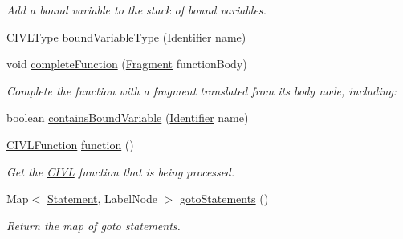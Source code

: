 \begin{DoxyCompactItemize}
\begin{DoxyCompactList}\small\item\em Add a bound variable to the stack of bound variables. \end{DoxyCompactList}\item 
\hyperlink{interfaceedu_1_1udel_1_1cis_1_1vsl_1_1civl_1_1model_1_1IF_1_1type_1_1CIVLType}{C\+I\+V\+L\+Type} \hyperlink{classedu_1_1udel_1_1cis_1_1vsl_1_1civl_1_1model_1_1common_1_1FunctionInfo_a1680ec437178dac2c5425ff419301e49}{bound\+Variable\+Type} (\hyperlink{interfaceedu_1_1udel_1_1cis_1_1vsl_1_1civl_1_1model_1_1IF_1_1Identifier}{Identifier} name)
\item 
void \hyperlink{classedu_1_1udel_1_1cis_1_1vsl_1_1civl_1_1model_1_1common_1_1FunctionInfo_a5fc1d2d85d5dac62ed6be12d10f61130}{complete\+Function} (\hyperlink{interfaceedu_1_1udel_1_1cis_1_1vsl_1_1civl_1_1model_1_1IF_1_1Fragment}{Fragment} function\+Body)
\begin{DoxyCompactList}\small\item\em Complete the function with a fragment translated from its body node, including\+: \end{DoxyCompactList}\item 
boolean \hyperlink{classedu_1_1udel_1_1cis_1_1vsl_1_1civl_1_1model_1_1common_1_1FunctionInfo_aa26f85c1a6c97f257de4e6d033dd98bb}{contains\+Bound\+Variable} (\hyperlink{interfaceedu_1_1udel_1_1cis_1_1vsl_1_1civl_1_1model_1_1IF_1_1Identifier}{Identifier} name)
\item 
\hyperlink{interfaceedu_1_1udel_1_1cis_1_1vsl_1_1civl_1_1model_1_1IF_1_1CIVLFunction}{C\+I\+V\+L\+Function} \hyperlink{classedu_1_1udel_1_1cis_1_1vsl_1_1civl_1_1model_1_1common_1_1FunctionInfo_a6938931465946cc1c802c0cb576f99cd}{function} ()
\begin{DoxyCompactList}\small\item\em Get the \hyperlink{classedu_1_1udel_1_1cis_1_1vsl_1_1civl_1_1CIVL}{C\+I\+V\+L} function that is being processed. \end{DoxyCompactList}\item 
Map$<$ \hyperlink{interfaceedu_1_1udel_1_1cis_1_1vsl_1_1civl_1_1model_1_1IF_1_1statement_1_1Statement}{Statement}, Label\+Node $>$ \hyperlink{classedu_1_1udel_1_1cis_1_1vsl_1_1civl_1_1model_1_1common_1_1FunctionInfo_a1dfd9e1f8a29f743b15ec092aa439406}{goto\+Statements} ()
\begin{DoxyCompactList}\small\item\em Return the map of goto statements. \end{DoxyCompactList}\item 

\end{DoxyCompactItemize}
